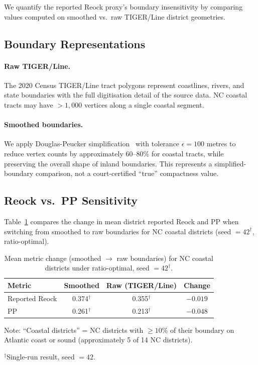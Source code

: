 We quantify the reported Reock proxy's boundary insensitivity by comparing
values computed on smoothed vs.\ raw TIGER/Line district geometries.

\subsection{Boundary Representations}

\paragraph{Raw TIGER/Line.}
The 2020 Census TIGER/Line tract polygons represent coastlines, rivers, and
state boundaries with the full digitisation detail of the source data.
NC coastal tracts may have $> 1{,}000$ vertices along a single coastal segment.

\paragraph{Smoothed boundaries.}
We apply Douglas-Peucker simplification~\citep{douglas1973algorithms}
with tolerance $\epsilon = 100$ metres to reduce vertex counts by approximately
60--80\% for coastal tracts, while preserving the overall shape of inland boundaries.
This represents a simplified-boundary comparison, not a court-certified
``true'' compactness value.

\subsection{Reock vs.\ PP Sensitivity}

Table~\ref{tab:boundary_sensitivity} compares the change in mean district reported Reock
and PP when switching from smoothed to raw boundaries for NC coastal districts
(seed $= 42^\dagger$, ratio-optimal).

\begin{table}[ht]
\centering
\caption{Mean metric change (smoothed $\to$ raw boundaries) for NC coastal
  districts under ratio-optimal, seed $= 42^\dagger$.}
\label{tab:boundary_sensitivity}
\begin{tabular}{lccc}
\toprule
Metric & Smoothed & Raw (TIGER/Line) & Change \\
\midrule
Reported Reock & 0.374$^\dagger$ & 0.355$^\dagger$ & $-0.019$ \\
PP    & 0.261$^\dagger$ & 0.213$^\dagger$ & $-0.048$ \\
\bottomrule
\end{tabular}
\begin{tablenotes}
\footnotesize
\item Note: ``Coastal districts'' = NC districts with $\geq 10$\% of their
  boundary on Atlantic coast or sound (approximately 5 of 14 NC districts).
\item $^\dagger$Single-run result, seed $= 42$.
\end{tablenotes}
\end{table}

